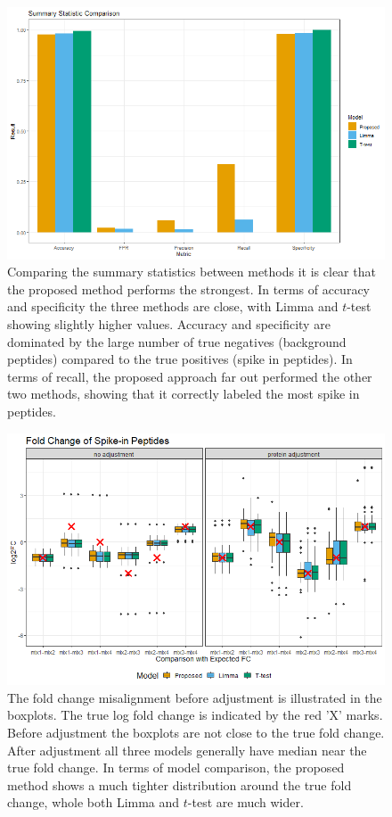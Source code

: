 \documentclass{mcp}
\begin{document}
\begin{figure}[h!]
\centering
\includegraphics[width=.85\textwidth]{sim_new/spike_in_statistic_comparison}
\caption{Comparing the summary statistics between methods it is clear that the proposed method performs the strongest. In terms of accuracy and specificity the three methods are close, with Limma and $t$-test showing slightly higher values. Accuracy and specificity are dominated by the large number of true negatives (background peptides) compared to the true positives (spike in peptides). In terms of recall, the proposed approach far out performed the other two methods, showing that it correctly labeled the most spike in peptides. \label{fig:spike_stat}}
\end{figure}

\begin{figure}[h!]
\centering
\includegraphics[width=.85\textwidth]{sim_new/spike_in_fc}
\caption{The fold change misalignment before adjustment is illustrated in the boxplots. The true log fold change is indicated by the red 'X' marks. Before adjustment the boxplots are not close to the true fold change. After adjustment all three models generally have median near the true fold change. In terms of model comparison, the proposed method shows a much tighter distribution around the true fold change, whole both Limma and $t$-test are much wider. \label{fig:spike_fc}}
\end{figure}
\end{document}
